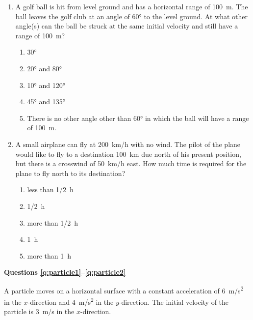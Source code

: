 \documentclass{../../../oss-apphys}
\begin{document}
\begin{multicols}{2}
\begin{enumerate}[resume,leftmargin=18pt]
  \item A golf ball is hit from level ground and has a horizontal range of
    \SI{100}{m}. The ball leaves the golf club at an angle of \ang{60} to the
    level ground. At what other angle(s) can the ball be struck at the same
    initial velocity and still have a range of \SI{100}{m}?
    \begin{center}
      \vspace{-.2in}
    \end{center}
    \begin{enumerate}[noitemsep,topsep=0pt,leftmargin=18pt,label=(\Alph*)]
    \item\ang{30}
    \item\ang{20} and \ang{80}
    \item\ang{10} and \ang{120}
    \item\ang{45} and \ang{135}
    \item There is no other angle other than \ang{60} in which the ball will
      have a range of \SI{100}{m}.
    \end{enumerate}
    
  \item A small airplane can fly at \SI{200}{km/h} with no wind. The pilot of
    the plane would like to fly to a destination \SI{100}{km} due north of his
    present position, but there is a crosswind of \SI{50}{km/h} east. How much
    time is required for the plane to fly north to its destination?
    \begin{enumerate}[noitemsep,topsep=0pt,leftmargin=18pt,label=(\Alph*)]
    \item less than \SI{1/2}{\hour}
    \item \SI{1/2}{\hour}
    \item more than \SI{1/2}{\hour}
    \item \SI{1}{\hour}
    \item more than \SI{1}{\hour}
    \end{enumerate}
    
  \end{enumerate}
  \columnbreak
  
  \textbf{Questions \ref{q:particle1}--\ref{q:particle2}}

  A particle moves on a horizontal surface with a constant acceleration of
  \SI{6}{m/s^2} in the $x$-direction and \SI{4}{m/s^2} in the $y$-direction. The
  initial velocity of the particle is \SI{3}{m/s} in the $x$-direction.
  

\end{multicols}
\end{document}
